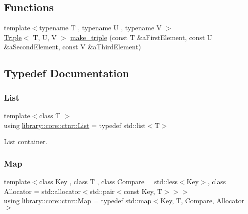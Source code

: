 \subsection*{Functions}
\begin{DoxyCompactItemize}
\item 
{\footnotesize template$<$typename T , typename U , typename V $>$ }\\\hyperlink{structlibrary_1_1core_1_1ctnr_1_1Triple}{Triple}$<$ T, U, V $>$ \hyperlink{namespacelibrary_1_1core_1_1ctnr_a96a0b941c0de59772cb5e073d0c2b8a8}{make\+\_\+triple} (const T \&a\+First\+Element, const U \&a\+Second\+Element, const V \&a\+Third\+Element)
\end{DoxyCompactItemize}


\subsection{Typedef Documentation}
\mbox{\label{namespacelibrary_1_1core_1_1ctnr_a87ccf40619002299b341a5e76e989912}} 
\subsubsection{\texorpdfstring{List}{List}}
{\footnotesize\ttfamily template$<$class T $>$ \\
using \hyperlink{namespacelibrary_1_1core_1_1ctnr_a87ccf40619002299b341a5e76e989912}{library\+::core\+::ctnr\+::\+List} = typedef std\+::list$<$T$>$}



List container. 

\mbox{\label{namespacelibrary_1_1core_1_1ctnr_a248e088a0b4ec44aff451a5c3663dcee}} 
\subsubsection{\texorpdfstring{Map}{Map}}
{\footnotesize\ttfamily template$<$class Key , class T , class Compare  = std\+::less$<$\+Key$>$, class Allocator  = std\+::allocator$<$std\+::pair$<$const Key, T$>$$>$$>$ \\
using \hyperlink{namespacelibrary_1_1core_1_1ctnr_a248e088a0b4ec44aff451a5c3663dcee}{library\+::core\+::ctnr\+::\+Map} = typedef std\+::map$<$Key, T, Compare, Allocator$>$}



